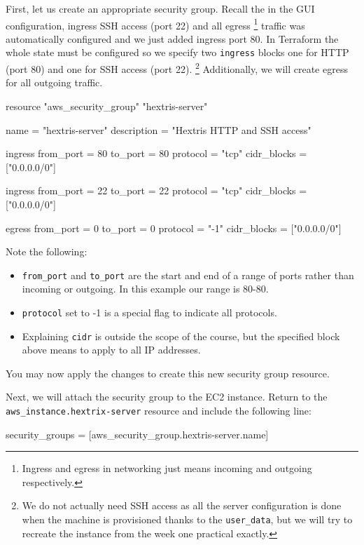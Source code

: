 \documentclass{csse4400}
\begin{document}
First, let us create an appropriate security group.
Recall the in the GUI configuration,
ingress SSH access (port 22) and all egress%
\footnote{Ingress and egress in networking just means incoming and outgoing respectively.}
traffic was automatically configured and we just added ingress port 80.
In Terraform the whole state must be configured so we specify two
\texttt{ingress} blocks one for HTTP (port 80) and one for SSH access (port 22).%
\footnote{We do not actually need SSH access as all the server configuration is done when the machine is provisioned thanks to the \texttt{user\_data},
but we will try to recreate the instance from the week one practical exactly.}
Additionally, we will create egress for all outgoing traffic.

\begin{code}[language=terraform]{}
resource "aws_security_group" "hextris-server" {
  name = "hextris-server"
  description = "Hextris HTTP and SSH access"

  ingress {
    from_port = 80
    to_port = 80
    protocol = "tcp"
    cidr_blocks = ["0.0.0.0/0"]
  }

  ingress {
    from_port = 22
    to_port = 22
    protocol = "tcp"
    cidr_blocks = ["0.0.0.0/0"]
  }

  egress {
    from_port = 0
    to_port = 0
    protocol = "-1"
    cidr_blocks = ["0.0.0.0/0"]
  }
}
\end{code}

Note the following:
\begin{itemize}
  \item \texttt{from\_port} and \texttt{to\_port} are the start and end of a range of ports rather than incoming or outgoing. In this example our range is 80-80.
  \item \texttt{protocol} set to -1 is a special flag to indicate all protocols.
  \item Explaining \texttt{cidr} is outside the scope of the course, but the specified block above means to apply to all IP addresses.
\end{itemize}

You may now apply the changes to create this new security group resource.

Next, we will attach the security group to the EC2 instance.
Return to the \texttt{aws\_instance.hextrix-server} resource
and include the following line:

\begin{code}[language=terraform]{}
security_groups = [aws_security_group.hextris-server.name]
\end{code}
\end{document}
